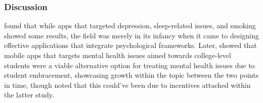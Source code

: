 \documentclass[12pt]{article}
\begin{document}


\subsubsection{Discussion}


\textcite{RefWorks:RefID:87-weisel2019standalone} found that while apps that targeted
depression, sleep-related issues, and smoking showed some results, the field was merely in its infancy when it
came to designing effective applications that integrate psychological frameworks. Later, 
\textcite{RefWorks:RefID:75-oliveira2021effectiveness} showed that mobile apps 
that targets mental health issues aimed towards college-level students were a viable alternative option for 
treating mental health issues due to student embracement, showcasing growth within the topic between the two points
in time, though noted that this could've been due to incentives attached within the latter study. \newline
\end{document}
